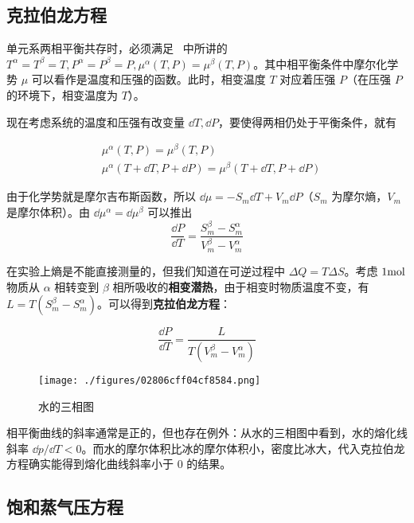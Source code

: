 
\begin{issues}
\issueDraft
\end{issues}


\subsection{克拉伯龙方程}
单元系两相平衡共存时，必须满足~ 中所讲的 $T^\alpha=T^\beta=T,P^\alpha=P^\beta=P,\mu^\alpha(T,P)=\mu^\beta(T,P)$。其中相平衡条件中摩尔化学势 $\mu$ 可以看作是温度和压强的函数。此时，相变温度 $T$ 对应着压强 $P$（在压强 $P$ 的环境下，相变温度为 $T$）。

现在考虑系统的温度和压强有改变量 $\dd T,\dd P$，要使得两相仍处于平衡条件，就有

\begin{align}
&\mu^\alpha(T,P)=\mu^\beta(T,P)\\
&\mu^\alpha(T+\dd T,P+\dd P)=\mu^\beta(T+\dd T,P+\dd P)
\end{align}

由于化学势就是摩尔吉布斯函数，所以 $\dd\mu=-S_m\dd T+V_m\dd P$（$S_m$ 为摩尔熵，$V_m$ 是摩尔体积）。由 $\dd \mu^\alpha=\dd \mu^\beta$ 可以推出
\begin{equation}
\frac{\dd P}{\dd T}=\frac{S^\beta_m-S^\alpha_m}{V^\beta_m-V^\alpha_m}
\end{equation}

在实验上熵是不能直接测量的，但我们知道在可逆过程中 $\Delta Q=T\Delta S$。考虑 $1\rm mol$ 物质从 $\alpha$ 相转变到 $\beta$ 相所吸收的\textbf{相变潜热}，由于相变时物质温度不变，有 $L=T(S_m^\beta-S_m^\alpha)$。可以得到\textbf{克拉伯龙方程}：

\begin{equation}\label{eq_Clapey_1}
\frac{\dd P}{\dd T}=\frac{L}{T(V^\beta_m-V^\alpha_m)}
\end{equation}
\begin{figure}[ht]
\centering
\texttt{[image: ./figures/02806cff04cf8584.png]}
\caption{水的三相图} \label{fig_Clapey_1}
\end{figure}

相平衡曲线的斜率通常是正的，但也存在例外：从水的三相图中看到，水的熔化线斜率 $\dd p/\dd T<0$。而水的摩尔体积比冰的摩尔体积小，密度比冰大，代入克拉伯龙方程确实能得到熔化曲线斜率小于 $0$ 的结果。

\subsection{饱和蒸气压方程}

